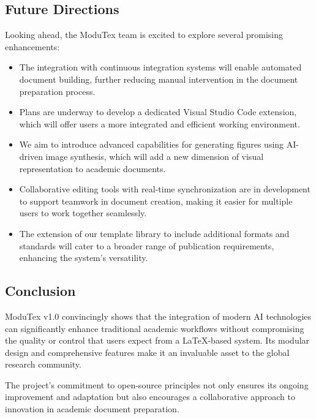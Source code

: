 \subsection{Future Directions}

Looking ahead, the ModuTex team is excited to explore several promising enhancements:

\begin{itemize}
    \item The integration with continuous integration systems will enable automated document building, further reducing manual intervention in the document preparation process.
    \item Plans are underway to develop a dedicated Visual Studio Code extension, which will offer users a more integrated and efficient working environment.
    \item We aim to introduce advanced capabilities for generating figures using AI-driven image synthesis, which will add a new dimension of visual representation to academic documents.
    \item Collaborative editing tools with real-time synchronization are in development to support teamwork in document creation, making it easier for multiple users to work together seamlessly.
    \item The extension of our template library to include additional formats and standards will cater to a broader range of publication requirements, enhancing the system's versatility.
\end{itemize}

\subsection{Conclusion}

ModuTex v1.0 convincingly shows that the integration of modern AI technologies can significantly enhance traditional academic workflows without compromising the quality or control that users expect from a LaTeX-based system. Its modular design and comprehensive features make it an invaluable asset to the global research community.

The project's commitment to open-source principles not only ensures its ongoing improvement and adaptation but also encourages a collaborative approach to innovation in academic document preparation.